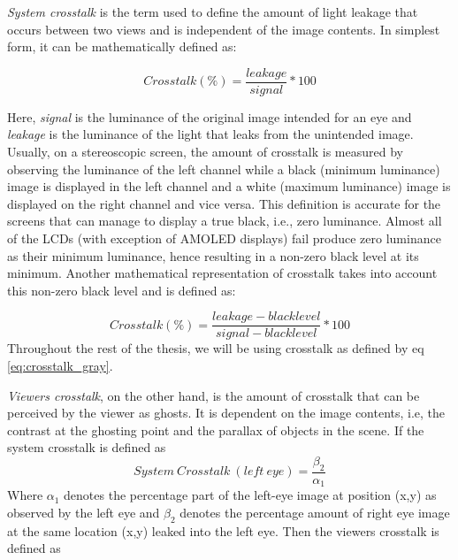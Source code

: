 \emph{System crosstalk} is the term used to define the amount of light leakage that occurs between two views and is independent of the image contents. In simplest form, it can be mathematically defined as:

\begin{equation}
Crosstalk(\%) = \frac{leakage}{signal} *100
\label{eq:simple_crosstalk}
\end{equation}

Here, \emph{signal} is the luminance of the original image intended for an eye and \emph{leakage} is the luminance of the light that leaks from the unintended image. Usually, on a stereoscopic screen, the amount of crosstalk is measured by observing the luminance of the left channel while a black (minimum luminance) image is displayed in the left channel and a white (maximum luminance) image is displayed on the right channel and vice versa. This definition is accurate for the screens that can manage to display a true black, i.e., zero luminance. Almost all of the LCDs (with exception of AMOLED displays) fail produce zero luminance as their minimum luminance, hence resulting in a non-zero black level at its minimum. Another mathematical representation of crosstalk takes into account this non-zero black level and is defined as:

\begin{equation}
Crosstalk(\%) = \frac{leakage - black level}{signal - black level} *100
\label{eq:crosstalk_gray}
\end{equation}
Throughout the rest of the thesis, we will be using crosstalk as defined by eq \ref{eq:crosstalk_gray}.

\emph{Viewers crosstalk}, on the other hand, is the amount of crosstalk that can be perceived by the viewer as ghosts. It is dependent on the image contents, i.e, the contrast at the ghosting point and the parallax of objects in the scene. If the system crosstalk is defined as
\begin{equation}
System\ Crosstalk\ (left\ eye) = \frac{\beta_2}{\alpha_1}
\label{eq:system_ct}
\end{equation}
Where \(\alpha_1\) denotes the percentage part of the left-eye image at position (x,y) as observed by the left eye and \(\beta_2\) denotes the percentage amount of right eye image at the same location (x,y) leaked into the left eye. Then the viewers crosstalk is defined as

